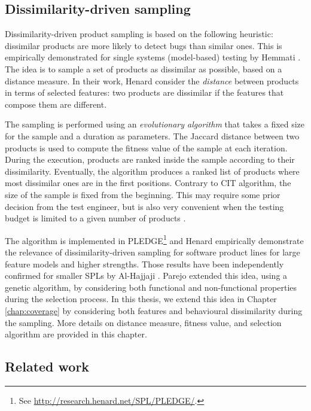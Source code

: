 \subsection{Dissimilarity-driven sampling}

Dissimilarity-driven product sampling is based on the following heuristic: dissimilar products are more likely to detect bugs than similar ones. This is empirically demonstrated for single systems (model-based) testing by Hemmati \etal \cite{Hemmati2010}. The idea is to sample a set of products as dissimilar as possible, based on a distance measure. In their work, Henard \etal \cite{Henard2014a} consider the \emph{distance} between products in terms of selected features: two products are dissimilar if the features that compose them are different. 

The sampling is performed using an \emph{evolutionary algorithm} that takes a fixed size for the sample and a duration as parameters. The Jaccard distance \cite{Jaccard1901} between two products is used to compute the fitness value of the sample at each iteration. During the execution, products are ranked inside the sample according to their dissimilarity. Eventually, the algorithm produces a ranked list of products where most dissimilar ones are in the first positions. Contrary to \gls{CIT} algorithm, the size of the sample is fixed from the beginning. This may require some prior decision from the test engineer, but is also very convenient when the testing budget is limited to a given number of products \cite{Halin2017b}. 

The algorithm is implemented in PLEDGE\footnote{See \url{http://research.henard.net/SPL/PLEDGE/}.} and Henard \etal \cite{Henard2014a} empirically demonstrate the relevance of dissimilarity-driven sampling for software product lines for large feature models and higher strengths. 
Those results have been independently confirmed for smaller \glspl{SPL} by Al-Hajjaji \etal \cite{Al-Hajjaji2016}. 
Parejo \etal \cite{Parejo2016} extended this idea, using a genetic algorithm, by considering both functional and non-functional properties during the selection process. 
In this thesis, we extend this idea in Chapter \ref{chap:coverage} by considering both features and behavioural dissimilarity during the sampling. More details on distance measure, fitness value, and selection algorithm are provided in this chapter.

\subsection{Related work}

